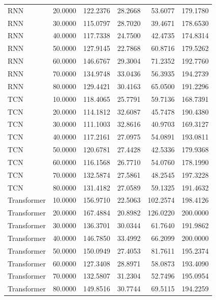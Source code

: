 \begin{tabular}{lrrrrr}
RNN & 20.0000 & 122.2376 & 28.2668 & 53.6077 & 179.1780 \\
RNN & 30.0000 & 115.0797 & 28.7020 & 39.4671 & 178.6530 \\
RNN & 40.0000 & 117.7338 & 24.7500 & 42.4735 & 174.8314 \\
RNN & 50.0000 & 127.9145 & 22.7868 & 60.8716 & 179.5262 \\
RNN & 60.0000 & 146.6767 & 29.3004 & 71.2352 & 192.7760 \\
RNN & 70.0000 & 134.9748 & 33.0436 & 56.3935 & 194.2739 \\
RNN & 80.0000 & 129.4421 & 30.4163 & 65.0500 & 191.2296 \\
TCN & 10.0000 & 118.4065 & 25.7791 & 59.7136 & 168.7391 \\
TCN & 20.0000 & 114.1812 & 32.6087 & 45.7478 & 190.4380 \\
TCN & 30.0000 & 111.1003 & 32.8616 & 40.9703 & 169.3127 \\
TCN & 40.0000 & 117.2161 & 27.0975 & 54.0891 & 193.0811 \\
TCN & 50.0000 & 120.6781 & 27.4428 & 42.5336 & 179.9368 \\
TCN & 60.0000 & 116.1568 & 26.7710 & 54.0760 & 178.1990 \\
TCN & 70.0000 & 132.5874 & 27.5861 & 48.2545 & 197.3228 \\
TCN & 80.0000 & 131.4182 & 27.0589 & 59.1325 & 191.4632 \\
Transformer & 10.0000 & 156.9710 & 22.5063 & 102.2574 & 198.4126 \\
Transformer & 20.0000 & 167.4884 & 20.8982 & 126.0220 & 200.0000 \\
Transformer & 30.0000 & 136.3701 & 30.0344 & 61.7640 & 191.9862 \\
Transformer & 40.0000 & 146.7850 & 33.4992 & 66.2099 & 200.0000 \\
Transformer & 50.0000 & 150.0949 & 27.4053 & 81.7611 & 195.2374 \\
Transformer & 60.0000 & 127.3408 & 28.8971 & 58.0873 & 193.4090 \\
Transformer & 70.0000 & 132.5807 & 31.2304 & 52.7496 & 195.0954 \\
Transformer & 80.0000 & 149.8516 & 30.7744 & 69.5115 & 194.2259 \\
\bottomrule
\end{tabular}
